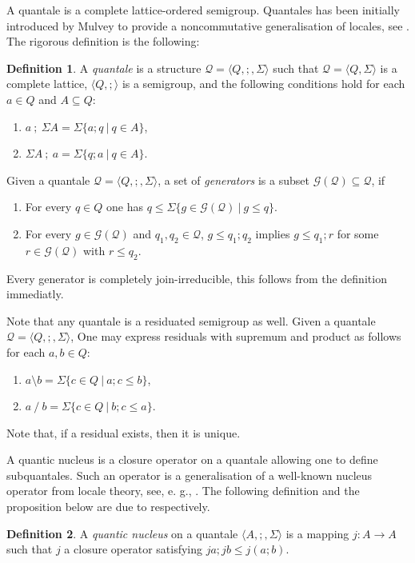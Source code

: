 \documentclass[a4paper]{article}
\theoremstyle{definition}
\newtheorem{definition}{Definition}
\theoremstyle{theorem}
\theoremstyle{proposition}
\theoremstyle{lemma}
\theoremstyle{ex}
\theoremstyle{corollary}
\theoremstyle{claim}
\begin{document}
A quantale is a complete lattice-ordered semigroup. Quantales has been initially introduced by Mulvey to provide a noncommutative generalisation of locales, see \cite{mulvey1986suppl}. The rigorous definition is the following:

\begin{definition}
  A \emph{quantale} is a structure $\mathcal{Q} = \langle Q, ;, \Sigma \rangle$ such that $\mathcal{Q} = \langle Q, \Sigma \rangle$ is a complete lattice, $\langle Q, ; \rangle$ is a semigroup, and the following conditions hold for each $a \in Q$ and $A \subseteq Q$:
  \begin{enumerate}
    \item $a \: ; \: \Sigma A = \Sigma \{ a ; q \: | \: q \in A \}$,
    \item $\Sigma A \: ; \: a = \Sigma \{ q ; a \: | \: q \in A \}$.
  \end{enumerate}
\end{definition}

Given a quantale $\mathcal{Q} = \langle Q, ;, \Sigma \rangle$, a set of \emph{generators} is a subset $\mathcal{G}(\mathcal{Q}) \subseteq \mathcal{Q}$, if
\begin{enumerate}
  \item For every $q \in Q$ one has $q \leq \Sigma \{ g \in \mathcal{G}(\mathcal{Q}) \: | \: g \leq q \}$.
  \item For every $g \in \mathcal{G}(\mathcal{Q})$ and $q_1, q_2 \in \mathcal{Q}$, $g \leq q_1 ; q_2$ implies $g \leq q_1 ; r$ for some $r \in \mathcal{G}(\mathcal{Q})$ with $r \leq q_2$.
\end{enumerate}

Every generator is completely join-irreducible, this follows from the definition immediatly.

Note that any quantale is a residuated semigroup as well. Given a quantale $\mathcal{Q} = \langle Q, ;, \Sigma \rangle$, One may express residuals with supremum and product as follows for each $a, b \in Q$:
\begin{enumerate}
  \item $a \setminus b = \Sigma \{ c \in Q \: | \: a ; c \leq b \}$,
  \item $a \: / \: b = \Sigma \{ c \in Q\: | \: b ; c \leq a \}$.
\end{enumerate}
Note that, if a residual exists, then it is unique.

A quantic nucleus is a closure operator on a quantale allowing one to define subquantales. Such an operator is a generalisation of a well-known nucleus operator from locale theory, see, e. g., \cite{bezhanishvili2016locales}. The following definition and the proposition below are due to \cite[Definition 3.1.1, Theorem 3.1.1]{rosenthal1990quantales} respectively.
\begin{definition}
  A \emph{quantic nucleus} on a quantale $\langle A, ;, \Sigma \rangle$ is a mapping $j : A \to A$ such that $j$ a closure operator satisfying $j a ; j b \leq j (a ; b)$.
\end{definition}
\end{document}
